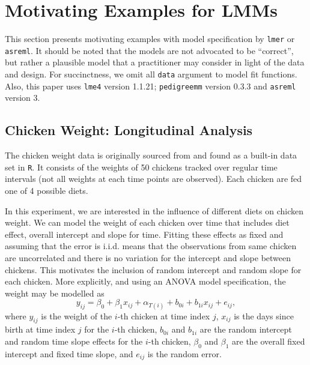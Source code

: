 \documentclass[runningheads]{llncs}\usepackage[]{graphicx}\usepackage[]{color}
\begin{document}
\hypertarget{examples}{%
	\section{Motivating Examples for LMMs}\label{examples}}

This section presents motivating examples with model specification by \texttt{lmer} or \texttt{asreml}. It should be noted that the models are not advocated to be ``correct'', but rather a plausible model that a practitioner may consider in light of the data and design. For succinctness, we omit all \texttt{data} argument to model fit functions. Also, this paper uses \texttt{lme4} version 1.1.21; \texttt{pedigreemm} version 0.3.3 and \texttt{asreml} version 3. 

\hypertarget{chick}{%
	\subsection{Chicken Weight: Longitudinal Analysis}\label{chick}}

The chicken weight data is originally sourced from \citet{chickendata} and found as a built-in data set in \texttt{R}. It consists of the weights of 50 chickens tracked over regular time intervals (not all weights at each time points are observed). Each chicken are fed one of 4 possible diets. 

In this experiment, we are interested in the influence of different diets on chicken weight. We can model the weight of each chicken over time that includes diet effect, overall intercept and slope for time. Fitting these effects as fixed and assuming that the error is i.i.d. means that the observations from same chicken are uncorrelated and there is no variation for the intercept and slope between chickens. This motivates the inclusion of random intercept and random slope for each chicken. More explicitly, and using an ANOVA model specification, the weight may be modelled as
\begin{equation}
y_{ij} = \beta_0 + \beta_1x_{ij} + \alpha_{T(i)} + b_{0i} + b_{1i}x_{ij} + e_{ij}, \label{eq:chickmodel}
\end{equation}
where \(y_{ij}\) is the weight of the \(i\)-th chicken at time index \(j\), \(x_{ij}\) is the days since birth at time index \(j\) for the \(i\)-th chicken, \(b_{0i}\) and \(b_{1i}\) are the random intercept and random time slope effects for the \(i\)-th chicken, \(\beta_0\) and \(\beta_1\) are the overall fixed intercept and fixed time slope, and $e_{ij}$ is the random error.
\end{document}
